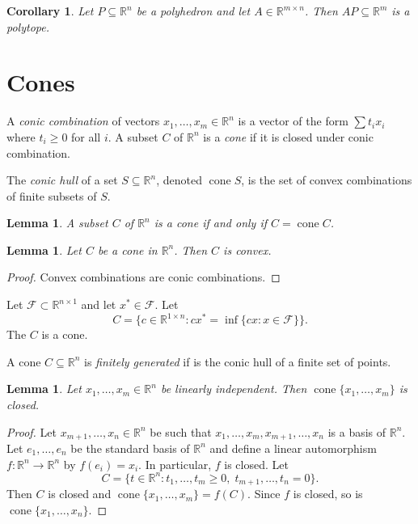 \documentclass[12pt]{amsart}
\newtheorem{lemma}[theorem]{Lemma}
\newtheorem{corollary}[theorem]{Corollary}
\theoremstyle{definition}
\theoremstyle{remark}
\numberwithin{equation}{section}
\newcommand{\RR}{\mathbb{R}}
\newcommand{\cF}{\mathcal{F}}
\DeclareMathOperator{\cone}{cone}
\begin{document}
\begin{corollary}
    Let $P\subseteq\RR^n$ be a polyhedron and let
    $A\in\RR^{m\times n}$.
    Then $AP\subseteq\RR^m$ is a polytope.
\end{corollary}



\section{Cones}

A \emph{conic combination} of vectors $x_1,\ldots,x_m\in \RR^n$
is a vector of the form $\sum t_ix_i$ where $t_i\geq 0$ for all $i$.
A subset $C$ of $\RR^n$ is a \emph{cone} if it is closed under conic
combination.

The \emph{conic hull} of a set $S\subseteq\RR^n$, denoted $\cone S$, is the set of
convex combinations of finite subsets of $S$.

\begin{lemma}
    A subset $C$ of $\RR^n$ is a cone if and only if $C = \cone C$.    
\end{lemma}

\begin{lemma}
    Let $C$ be a cone in $\RR^n$. Then $C$ is convex.
\end{lemma}

\begin{proof}
    Convex combinations are conic combinations.
\end{proof}

Let $\cF\subset\RR^{n\times 1}$ and let $x^*\in\cF$. Let
\[
    C = \{c\in \RR^{1\times n} : cx^* = \inf\{cx : x\in\cF\}\}.
\]
The $C$ is a cone.


A cone $C\subseteq\RR^n$ is \emph{finitely generated} if is the conic
hull of a finite set of points.

\begin{lemma}
    Let $x_1,\ldots,x_m\in\RR^n$ be linearly independent.
    Then $\cone\{x_1,\ldots,x_m\}$ is closed.
\end{lemma}

\begin{proof}
Let $x_{m+1},\ldots,x_n\in\RR^n$ be such that
$x_1,\ldots,x_m,x_{m+1},\ldots,x_n$ is a basis of $\RR^n$.
Let $e_1,\ldots,e_n$ be the standard basis of $\RR^n$ and define
a linear automorphism $f:\RR^n\to\RR^n$ by $f(e_i) = x_i$.
In particular, $f$ is closed.
Let
\[
    C = \{t\in\RR^n: t_1,\ldots,t_m\geq 0,\; t_{m+1},\ldots,t_n=0\}.
\]
Then $C$ is closed and $\cone\{x_1,\ldots,x_m\}=f(C)$.
Since $f$ is closed, so is $\cone\{x_1,\ldots,x_n\}$.
\end{proof}
\end{document}
